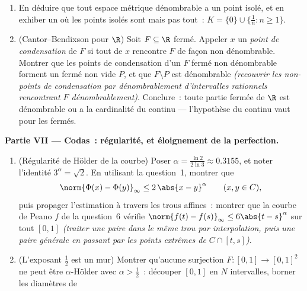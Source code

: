 \begin{problem}
\begin{enumerate}[resume]
        métrique   contient une copie
        homéomorphe de l'ensemble de Cantor. L'ensemble de
        Cantor n'est pas une curiosité mais le germe
        universel de la perfection compacte.
  \item En déduire que tout espace métrique  dénombrable
        a un point isolé, et en exhiber un où les points
        isolés sont  mais pas tout~: $K = \{0\} \cup
        \{\frac1n : n \geq 1\}$.
  \item (Cantor--Bendixson pour $\R$) Soit $F \subseteq \R$
        fermé. Appeler $x$ un \emph{point de condensation} de
        $F$ si tout  de $x$ rencontre $F$ de façon non
        dénombrable. Montrer que les points de condensation
        d'un $F$ fermé non dénombrable forment un 
        fermé non vide $P$, et que $F \setminus P$ est
        dénombrable \emph{(recouvrir les non-points de
        condensation par dénombrablement d'intervalles
        rationnels rencontrant $F$ dénombrablement)}.
        Conclure~: toute partie fermée de $\R$ est dénombrable
        ou a la cardinalité du continu --- l'hypothèse du
        continu vaut pour les fermés.
\end{enumerate}
\medskip
\noindent\textbf{Partie VII --- Codas~: régularité, et
éloignement de la perfection.}
\begin{enumerate}[resume]
  \item (Régularité de Hölder de la courbe) Poser $\alpha =
        \frac{\ln 2}{2\ln 3} \approx 0.3155$, et noter
        l'identité $3^\alpha = \sqrt2$. En utilisant la
        question~1, montrer que
        \[
        \norm{\Phi(x) - \Phi(y)}_\infty \leq 2\,\abs{x -
        y}^\alpha \qquad (x, y \in C),
        \]
        puis propager l'estimation à travers les trous
        affines~: montrer que la courbe de Peano $f$ de la
        question~6 vérifie $\norm{f(t) - f(s)}_\infty \leq
        6\abs{t - s}^\alpha$ sur tout $[0,1]$ \emph{(traiter
        une paire dans le même trou par interpolation, puis
        une paire générale en passant par les points extrêmes
        de $C \cap [t, s]$)}.
  \item (L'exposant $\frac12$ est un mur) Montrer qu'aucune
        surjection $F \colon [0,1] \to [0,1]^2$ ne peut être
        $\alpha$-Hölder avec $\alpha > \frac12$~: découper
        $[0,1]$ en $N$ intervalles, borner les diamètres de

\end{enumerate}
\end{problem}
